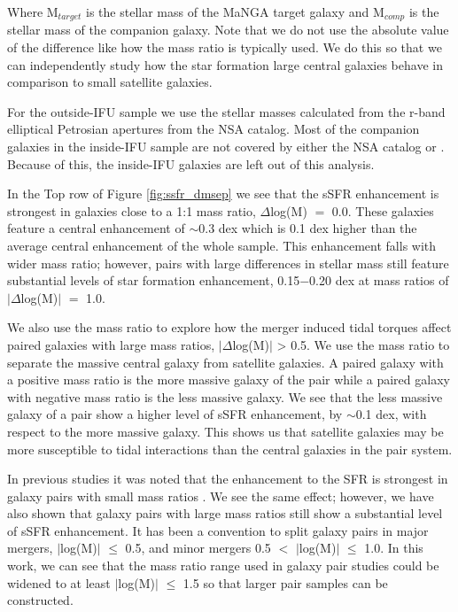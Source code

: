 \documentclass[iop,revtex4,twocolumn,apj,numberedappendix,appendixfloats]{emulateapj}
\begin{document}
Where M$_{target}$ is the stellar mass of the MaNGA target galaxy and M$_{comp}$ is the stellar mass of the companion galaxy. Note that we do not use the absolute value of the difference like how the mass ratio is typically used. We do this so that we can independently study how the star formation large central galaxies behave in comparison to small satellite galaxies.

For the outside-IFU sample we use the stellar masses calculated from the r-band elliptical Petrosian apertures from the NSA catalog. Most of the companion galaxies in the inside-IFU sample are not covered by either the NSA catalog or \citet{Simard:2011}. Because of this, the inside-IFU galaxies are left out of this analysis.

In the Top row of Figure \ref{fig:ssfr_dmsep} we see that the sSFR enhancement is strongest in galaxies close to a 1:1 mass ratio, $\Delta$log(M) $=$ 0.0. These galaxies feature a central enhancement of $\sim$0.3 dex which is 0.1 dex higher than the average central enhancement of the whole sample. This enhancement falls with wider mass ratio; however, pairs with large differences in stellar mass still feature substantial levels of star formation enhancement, 0.15$-$0.20 dex at mass ratios of $|\Delta$log(M)$|$ $=$ 1.0.

We also use the mass ratio to explore how the merger induced tidal torques affect paired galaxies with large mass ratios, $|\Delta$log(M)$|$ > 0.5. We use the mass ratio to separate the massive central galaxy from satellite galaxies. A paired galaxy with a positive mass ratio is the more massive galaxy of the pair while a paired galaxy with negative mass ratio is the less massive galaxy. We see that the less massive galaxy of a pair show a higher level of sSFR enhancement, by $\sim$0.1 dex, with respect to the more massive galaxy. This shows us that satellite galaxies may be more susceptible to tidal interactions than the central galaxies in the pair system. 

In previous studies it was noted that the enhancement to the SFR is strongest in galaxy pairs with small mass ratios \citet{Ellison:2008}. We see the same effect; however, we have also shown that galaxy pairs with large mass ratios still show a substantial level of sSFR enhancement. It has been a convention to split galaxy pairs in major mergers, $|$log(M)$|$ $\le$ 0.5, and minor mergers 0.5 $<$ $|$log(M)$|$ $\le$ 1.0. In this work, we can see that the mass ratio range used in galaxy pair studies could be widened to at least $|$log(M)$|$ $\le$ 1.5 so that larger pair samples can be constructed.  
\end{document}
